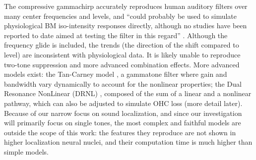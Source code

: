 \documentclass[11pt,a4paper]{article}
\begin{document}
The compressive gammachirp accurately reproduces human auditory filters over many center frequencies and levels, and \enquote{could probably be used to simulate physiological BM iso-intensity responses directly, although no studies have been reported to date aimed at testing the filter in this regard} \cite{meddisAuditoryPeripheryPinna2010}. Although the frequency glide is included, the trends (the direction of the shift compared to level) are inconsistent with physiological data. It is likely unable \cite{plackLinearNonlinearProcesses2002} to reproduce two-tone suppression and more advanced combination effects. More advanced models exist: the Tan-Carney model \cite{tanPhenomenologicalModelResponses2003}, a gammatone filter where gain and bandwidth vary dynamically to account for the nonlinear properties; the Dual Resonance NonLinear (DRNL) \cite{lopez-povedaHumanNonlinearCochlear2001}, composed of the sum of a linear and a nonlinear pathway, which can also be adjusted to simulate OHC loss (more detail later). Because of our narrow focus on sound localization, and since our investigation will primarily focus on single tones, the most complex and faithful models are outside the scope of this work: the features they reproduce are not shown in higher localization neural nuclei, and their computation time is much higher than simple models.
\end{document}
